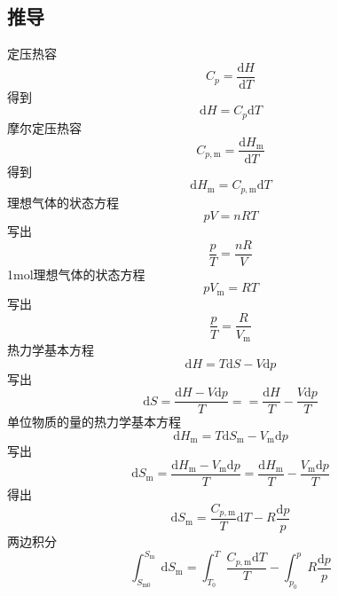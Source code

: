 \newpage
\subsection{推导}
定压热容
\begin{equation}
    C_p=\frac{\mathrm{d}H}{\mathrm{d}T}
\end{equation}
得到
\begin{equation}
    \mathrm{d}H=C_p\mathrm{d}T
\end{equation}
摩尔定压热容
\begin{equation}
    C_{p,\mathrm{m}}=\frac{\mathrm{d}H_{\mathrm{m}}}{\mathrm{d}T}
\end{equation}
得到
\begin{equation}
    \mathrm{d}H_{\mathrm{m}}=C_{p,\mathrm{m}}\mathrm{d}T
\end{equation}
理想气体的状态方程
\begin{equation}
    pV=nRT
\end{equation}
写出
\begin{equation}
    \frac{p}{T}=\frac{nR}{V}
\end{equation}
1mol理想气体的状态方程
\begin{equation}
    pV_{\mathrm{m}}=RT
\end{equation}
写出
\begin{equation}
    \frac{p}{T}=\frac{R}{V_{\mathrm{m}}}
\end{equation}
热力学基本方程
\begin{equation}
    \mathrm{d}H=T\mathrm{d}S-V\mathrm{d}p
\end{equation}
写出
\begin{equation}
    \mathrm{d}S=\frac{\mathrm{d}H-V\mathrm{d}p}{T}==\frac{\mathrm{d}H}{T}-\frac{V\mathrm{d}p}{T}
\end{equation}
单位物质的量的热力学基本方程
\begin{equation}
    \mathrm{d}H_{\mathrm{m}}=T\mathrm{d}S_{\mathrm{m}}-V_{\mathrm{m}}\mathrm{d}p
\end{equation}
写出
\begin{equation}
    \mathrm{d}S_{\mathrm{m}}=\frac{\mathrm{d}H_{\mathrm{m}}-V_{\mathrm{m}}\mathrm{d}p}{T}=\frac{\mathrm{d}H_{\mathrm{m}}}{T}-\frac{V_{\mathrm{m}}\mathrm{d}p}{T}
\end{equation}
得出
\begin{equation}
    \mathrm{d}S_{\mathrm{m}}=\frac{C_{p,\mathrm{m}}}{T}\mathrm{d}T-R\frac{\mathrm{d}p}{p}
\end{equation}
两边积分
\begin{equation}
    \int_{S_{\mathrm{m}0}}^{S_{\mathrm{m}}}{\mathrm{d}S_{\mathrm{m}}}=\int_{T_0}^T{\frac{C_{p,\mathrm{m}}\mathrm{d}T}{T}}-\int_{p_0}^p{R\frac{\mathrm{d}p}{p}}
\end{equation}
